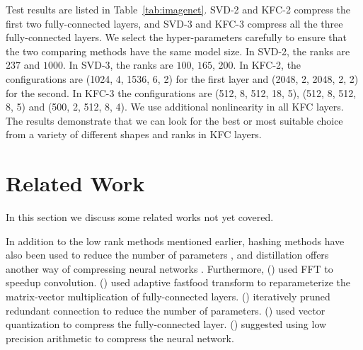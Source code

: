 \documentclass{article}
\begin{document}
Test results are listed in Table~\ref{tab:imagenet}. SVD-2 and KFC-2 compress the first two fully-connected layers, and SVD-3 and
KFC-3 compress all the three fully-connected layers. We select the hyper-parameters carefully to ensure that the two comparing methods have the same model size. In SVD-2, the ranks are $237$ and $1000$. In SVD-3, the ranks are $100$, $165$, $200$. In KFC-2,
the configurations are (1024, 4, 1536, 6, 2) for the first layer and (2048, 2, 2048, 2, 2) for the second.
In KFC-3 the configurations are (512, 8, 512, 18, 5), (512, 8, 512, 8, 5) and (500, 2, 512, 8, 4). We use additional nonlinearity in all
KFC layers. The results demonstrate that we can look for the best or most suitable choice from a variety of different shapes and ranks in KFC layers.

\section{Related Work}
In this section we discuss some related works not yet covered.

In addition to the low rank methods mentioned earlier, hashing methods have also been used to reduce the number of parameters \cite{DBLP:conf/icml/ChenWTWC15,bakhtiary2015speeding}, and distillation offers another way of compressing neural networks \cite{hinton2015distilling}. Furthermore, \citeauthor{mathieu2013fast} (\citeyear{mathieu2013fast}) used FFT to speedup convolution. \citeauthor{DBLP:conf/aistats/YangWSS15} (\citeyear{DBLP:conf/aistats/YangWSS15}) used adaptive fastfood transform to reparameterize the matrix-vector multiplication of fully-connected layers.  \citeauthor{han2015learning} (\citeyear{han2015learning}) iteratively pruned redundant connection to reduce the number of parameters. \citeauthor{gong2014compressing} (\citeyear{gong2014compressing}) used vector quantization to compress the fully-connected layer.  \citeauthor{DBLP:conf/icml/GuptaAGN15} (\citeyear{DBLP:conf/icml/GuptaAGN15}) suggested using low precision arithmetic to compress the neural network.
\end{document}
